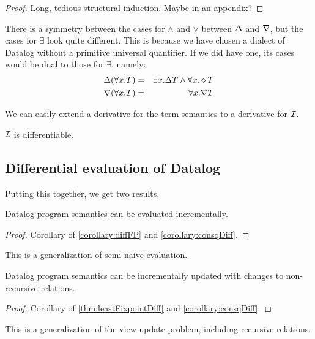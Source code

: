 \ifproofs
\begin{proof}
  Long, tedious structural induction. Maybe in an appendix?
\end{proof}
\fi

There is a symmetry between the cases for $\wedge$ and $\vee$ between $\Delta$
and $\nabla$, but the cases for $\exists$ look quite different. 
This is because we have chosen a dialect of Datalog without a primitive universal quantifier.
If we did have one, its cases would be dual to those for $\exists$, namely:
\begin{eqnarray*}
\Delta(\forall x.T) & = & \exists x. \Delta T \wedge \forall x. \diamond T\\
\nabla(\forall x.T) & = & \forall x. \nabla T
\end{eqnarray*}

We can easily extend a derivative for the term semantics to a derivative for $\mathcal{I}$.

\begin{corollary}
\label{corollary:consqDiff}
  $\mathcal{I}$ is differentiable.
\end{corollary}

\subsection{Differential evaluation of Datalog}

Putting this together, we get two results.

\begin{thm}
\label{thm:diffEval}
  Datalog program semantics can be evaluated incrementally.
\end{thm}
\ifproofs
\begin{proof}
  Corollary of \cref{corollary:diffFP} and \cref{corollary:consqDiff}.
\end{proof}
\fi

This is a generalization of semi-naive evaluation.

\begin{thm}
\label{thm:diffUpdate}
  Datalog program semantics can be incrementally updated with changes to non-recursive relations.
\end{thm}
\ifproofs
\begin{proof}
  Corollary of \cref{thm:leastFixpointDiff} and \cref{corollary:consqDiff}.
\end{proof}
\fi

This is a generalization of the view-update problem, including recursive relations.

